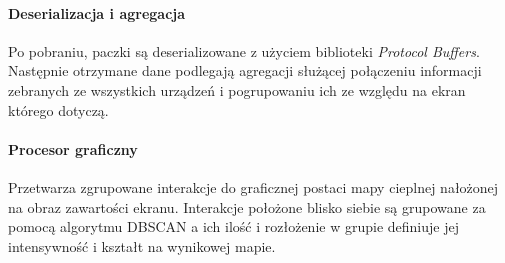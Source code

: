 \paragraph{Deserializacja i agregacja}
Po pobraniu, paczki są deserializowane z użyciem biblioteki {\it Protocol Buffers}. Następnie otrzymane dane podlegają agregacji służącej połączeniu informacji zebranych ze wszystkich urządzeń i pogrupowaniu ich ze względu na ekran którego dotyczą.

\paragraph{Procesor graficzny} 
\label{par:rs_graphical_processor}
Przetwarza zgrupowane interakcje do graficznej postaci mapy cieplnej nałożonej na obraz zawartości ekranu. Interakcje położone blisko siebie są grupowane za pomocą algorytmu DBSCAN \cite{DBSCAN_Wiki} a ich ilość i rozłożenie w grupie definiuje jej intensywność i kształt na wynikowej mapie.

